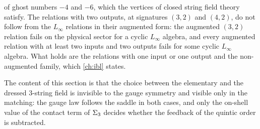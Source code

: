 of ghost numbers $-4$ and $-6$, which the vertices of closed string field theory satisfy.
The relations with two outputs, at signatures $(3, 2)$ and $(4, 2)$, do not follow from the $L_\infty$ relations in their augmented form: the augmented $(3, 2)$ relation fails on the physical sector for a cyclic $L_\infty$ algebra, and every augmented relation with at least two inputs and two outputs fails for some cyclic $L_\infty$ algebra.
What holds are the relations with one input or one output and the non-augmented family, which \cref{ch:ibl} states.

The content of this section is that the choice between the elementary and the dressed $3$-string field is invisible to the gauge symmetry and visible only in the matching: the gauge law follows the saddle in both cases, and only the on-shell value of the contact term of $\Sigma_3$ decides whether the feedback of the quintic order is subtracted.
